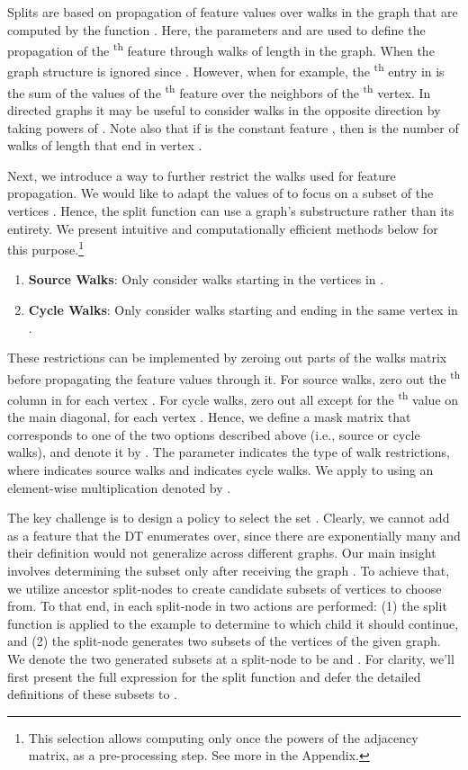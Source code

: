 Splits are based on propagation of feature values over walks in the graph that are computed by the function . Here, the parameters  and  are used to define the propagation of the \textsuperscript{th} feature through walks of length  in the graph. When  the graph structure is ignored since . However, when  for example, the \textsuperscript{th} entry in   is the sum of the values of the \textsuperscript{th} feature over the neighbors of the \textsuperscript{th} vertex. In directed graphs it may be useful to consider walks in the opposite direction by taking powers of . Note also that if  is the constant feature , then  is the number of walks
of length  that end in vertex .

Next, we introduce a way to further restrict the walks used for feature propagation.  
We would like to adapt the values of  to focus on a subset of the vertices .
Hence, the split function can use a graph's substructure rather than its entirety. We present intuitive and computationally efficient methods below for this purpose.\footnote{This selection allows computing only once the powers of the adjacency matrix, as a pre-processing step. See more in the Appendix.}

\begin{enumerate}
\item \textbf{Source Walks}: Only consider walks starting in the vertices in . 
\item \textbf{Cycle Walks}: Only consider walks starting and ending in the same vertex in . 
\end{enumerate}

These restrictions can be implemented by zeroing out parts of the walks matrix  before propagating the feature values  through it.
For source walks, zero out the \textsuperscript{th} column in  for each vertex . For cycle walks, zero out all  except for the \textsuperscript{th} value on the main diagonal, for each vertex .
Hence, we define a mask matrix that corresponds to one of the two options described above (i.e., source or cycle walks), and denote it by . The parameter  indicates the type of walk restrictions, where  indicates source walks and  indicates cycle walks.  We apply  to  using an element-wise multiplication denoted by .

The key challenge is to design a policy to select the set . Clearly, we cannot add  as a feature that the DT enumerates over, since there are exponentially many and their definition would not generalize across different graphs. Our main insight involves determining the subset  only after receiving the graph . To achieve that, we utilize ancestor split-nodes to create candidate subsets of vertices to choose from.
To that end, in each split-node in \acronym two actions are performed: (1) the split function is applied to the example to determine to which child it should continue, and (2) the split-node generates two subsets of the vertices of the given graph. We denote the two generated subsets at a split-node  to be  and .
For clarity, we'll first present the full expression for the split function  and defer the detailed definitions of these subsets to .

